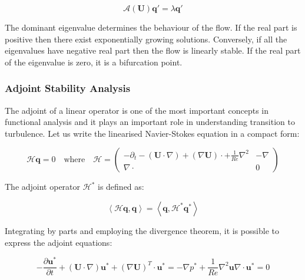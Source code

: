 \begin{equation}
   \mathcal{A}(\mathbf{U})\mathbf{q'}=\lambda \mathbf{q'}
\end{equation}

The dominant eigenvalue determines the behaviour of the flow. If the real part
is positive then there exist exponentially growing solutions. Conversely, if all
the eigenvalues have negative real part then the flow is linearly stable. If the real part of the eigenvalue is zero, it is a bifurcation point.

\subsubsection{Adjoint Stability Analysis}

The adjoint of a linear operator is one of the most important concepts in
functional analysis and it plays an important role in understanding transition to turbulence. Let us write the linearised Navier-Stokes equation in a compact form:

\begin{equation}
\mathcal{H}\mathbf{q}=0 \quad \mbox{where} \quad \mathcal{H}=\left( \begin{array}{c|c}
  -\partial_t-(\mathbf{U} \cdot \nabla)+ (\nabla \mathbf{U}) \cdot + \frac{1}{Re} \nabla^2 & -\nabla \\
  \hline
  \nabla \cdot  & 0
   \end{array}
 \right)
 \end{equation}


The adjoint operator $\mathcal{H}^*$ is defined as:

\begin{equation}
\left \langle \mathcal{H}\mathbf{q}, \mathbf{q} \right \rangle= \left \langle \mathbf{q}, \mathcal{H}^*\mathbf{q}^* \right \rangle
\end{equation}

Integrating by parts and employing the divergence theorem, it is possible to express the adjoint equations:

\begin{subequations}
\begin{equation}
-\frac{\partial \mathbf{u}^*}{\partial t}+(\mathbf{U} \cdot \nabla)\mathbf{u}^*+(\nabla \mathbf{U})^T \cdot \mathbf{u}^*=-\nabla p^*+\frac{1}{Re} \nabla^2 \mathbf{u}
\end{equation}

\begin{equation}
\nabla \cdot \mathbf{u}^*=0
\end{equation}
\end{subequations}

